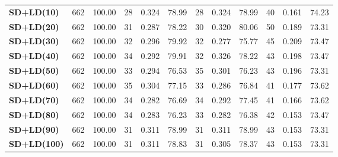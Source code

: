\documentclass[12pt, a4paper, twoside]{report}
\begin{document}
\begin{table}[htbp]
{\begin{tabular}{|l|c|c|ccc|ccc|ccc|}
\hline
\textbf{SD+LD(10)} & 662 & 100.00 & 28 & \cellcolor[HTML]{fef9e4}0.324 & 78.99 & 28 & 0.324 & 78.99 & 40 & 0.161 & \cellcolor[HTML]{fef9e4}74.23 \\
\textbf{SD+LD(20)} & 662 & 100.00 & 31 & 0.287 & 78.22 & 30 & 0.320 & \cellcolor[HTML]{fef9e4}80.06 & 50 & 0.189 & 73.31 \\
\textbf{SD+LD(30)} & 662 & 100.00 & 32 & 0.296 & \cellcolor[HTML]{fef9e4}79.92 & 32 & 0.277 & 75.77 & 45 & \cellcolor[HTML]{fef9e4}0.209 & 73.47 \\
\textbf{SD+LD(40)} & 662 & 100.00 & 34 & 0.292 & 79.91 & 32 & \cellcolor[HTML]{fef9e4}0.326 & 78.22 & 43 & 0.198 & 73.47 \\
\textbf{SD+LD(50)} & 662 & 100.00 & 33 & 0.294 & 76.53 & 35 & 0.301 & 76.23 & 43 & 0.196 & 73.31 \\
\textbf{SD+LD(60)} & 662 & 100.00 & 35 & 0.304 & 77.15 & 33 & 0.286 & 76.84 & 41 & 0.177 & 73.62 \\
\textbf{SD+LD(70)} & 662 & 100.00 & 34 & 0.282 & 76.69 & 34 & 0.292 & 77.45 & 41 & 0.166 & 73.62 \\
\textbf{SD+LD(80)} & 662 & 100.00 & 34 & 0.283 & 76.23 & 33 & 0.282 & 76.38 & 42 & 0.153 & 73.47 \\
\textbf{SD+LD(90)} & 662 & 100.00 & 31 & 0.311 & 78.99 & 31 & 0.311 & 78.99 & 43 & 0.153 & 73.31 \\
\textbf{SD+LD(100)} & 662 & 100.00 & 31 & 0.311 & 78.83 & 31 & 0.305 & 78.37 & 43 & 0.153 & 73.31 \\
\hline
\end{tabular}
}
\end{table}
\end{document}
